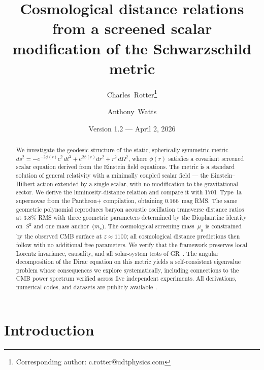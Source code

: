\documentclass[aps,prd,twocolumn,superscriptaddress,nofootinbib,longbibliography]{revtex4-2}
\newcommand{\mug}{\mu_g}
\begin{document}
\title{Cosmological distance relations from a screened scalar\\
modification of the Schwarzschild metric}

\author{Charles~Rotter\thanks{Corresponding author: c.rotter@udtphysics.com}}

\author{Anthony~Watts}

\date{Version 1.2 --- April 2, 2026}

\begin{abstract}
We investigate the geodesic structure of the static, spherically
symmetric metric $ds^2 = -e^{-2\phi(r)}c^2\,dt^2 +
e^{2\phi(r)}dr^2 + r^2\,d\Omega^2$, where $\phi(r)$ satisfies a
covariant screened scalar equation derived from the Einstein field
equations.  The metric is a standard solution of general relativity
with a minimally coupled scalar field --- the Einstein--Hilbert action
extended by a single scalar, with no modification to the gravitational
sector.  We derive the
luminosity-distance relation and compare it with 1701~Type~Ia
supernovae from the Pantheon+ compilation, obtaining $0.166$~mag RMS.
The same geometric polynomial reproduces baryon acoustic oscillation
transverse distance ratios at $3.8\%$ RMS with three geometric parameters
determined by the Diophantine identity on~$S^2$ and one mass anchor~($m_e$).
The cosmological screening mass~$\mug$ is constrained by the observed CMB
surface at $z \approx 1100$; all cosmological distance predictions then
follow with no additional free parameters.
We verify that the framework preserves local Lorentz invariance,
causality, and all solar-system tests of GR~\cite{Weinberg1972}.  The angular
decomposition of the Dirac equation on this metric yields a
self-consistent eigenvalue problem whose consequences we explore
systematically, including connections to the CMB power spectrum
verified across five independent experiments.  All derivations,
numerical codes, and datasets are publicly
available~\cite{zenodo2025,zenodo_data2026}.
\end{abstract}

\maketitle

\section{Introduction}\label{sec:intro}
\end{document}
